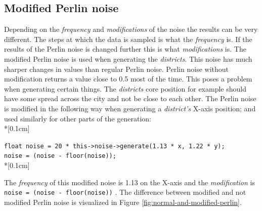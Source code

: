 	\subsection{Modified Perlin noise}
	Depending on the \textit{frequency} and \textit{modifications} of the noise the results can be very different. The steps at which the data is sampled is what the \textit{frequency} is. If the results of the Perlin noise is changed further this is what \textit{modifications} is. The modified Perlin noise is used when generating the \textit{districts}. This noise has much sharper changes in values than regular Perlin noise. Perlin noise without modification returns a value close to 0.5 most of the time. This poses a problem when generating certain things. The \textit{districts} core position for example should have some spread across the city and not be close to each other. The Perlin noise is modified in the following way when generating a \textit{district's} X-axis position; and used similarly for other parts of the generation:\\*[0.1cm]
	
	\texttt{float noise = 20 * this->noise->generate(1.13 * x, 1.22 * y);\\
		noise = (noise - floor(noise));}\\*[0.1cm]
		
	The \textit{frequency} of this modified noise is 1.13 on the X-axis and the \textit{modification} is \texttt{noise = (noise - floor(noise))} \cite{ModifiedNoise}.
	The difference between modified and not modified Perlin noise is visualized in Figure \ref{fig:normal-and-modified-perlin}.
		

